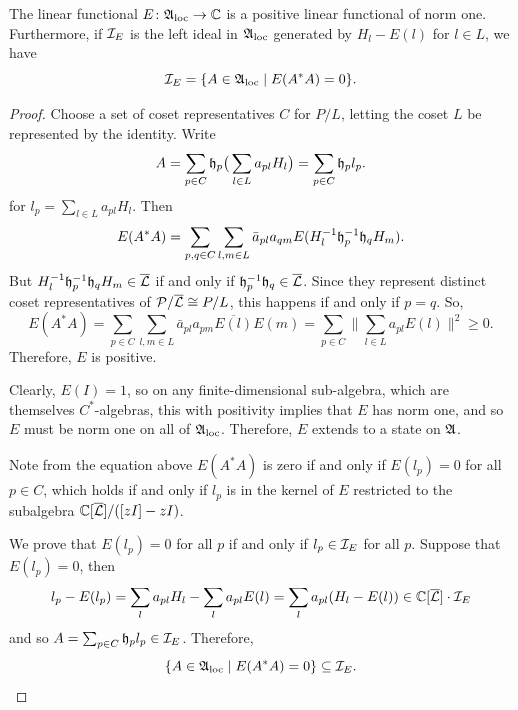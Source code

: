 \documentclass[11pt]{amsart}
\begin{document}
\begin{prop}
The linear functional $E \colon \mathfrak{A}_{\mathrm{loc}} \to \mathbb{C}$ is a positive linear functional of norm one.
Furthermore, if $\mathcal{I}_E$ is the left ideal in $\mathfrak{A}_{\mathrm{loc}}$ generated by $H_l-E(l)$ for $l\in L$, we have
\[\mathcal{I}_E = \{ A\in \mathfrak{A}_{\mathrm{loc}} \mid E(A^*A)=0\}.\]
\end{prop}
\begin{proof}
Choose a set of coset representatives $C$ for $P/L$, letting the coset $L$ be represented by the identity. Write
\[A = \sum_{p \in C}  \mathfrak{h}_p \big(\sum_{l \in L} a_{pl} H_l \big) = \sum_{p \in C}  \mathfrak{h}_p  l_p .\]
for $l_p = \sum_{l \in L} a_{pl}  H_l $. Then
\[E(A^*A) =  \sum_{p,q \in C} \sum_{l,m\in L} \bar{a}_{pl}a_{qm}E(H_l^{-1}\mathfrak{h}_p^{-1}\mathfrak{h}_qH_m).\]
But $H_l^{-1}\mathfrak{h}_p^{-1}\mathfrak{h}_q H_m \in \overline{\mathcal{L}}$ if and only if $\mathfrak{h}_p^{-1}\mathfrak{h}_q \in \overline{\mathcal{L}}$. Since they represent distinct coset representatives of $\mathcal{P}/\overline{\mathcal{L}} \cong P/L$, this happens if and only if $p=q$. So,
 \[E(A^*A) =  \sum_{p \in C} \sum_{l,m\in L} \bar{a}_{pl}a_{pm}\overline{E(l)}E(m) =  \sum_{p \in C}\big \| \sum_{l\in L} a_{pl}E(l) \big \|^2 \geq 0.\]
Therefore, $E$ is positive.

Clearly, $E(I)=1$, so on any finite-dimensional sub-algebra, which are themselves $C^*$-algebras, this with positivity implies that $E$ has norm one, and so $E$ must be norm one on all of $\mathfrak{A}_{\mathrm{loc}}$. Therefore, $E$ extends to a state on $\mathfrak{A}$.

Note from the equation above $E(A^*A) $ is zero if and only if
$ E(l_p)  =0$ for all $p\in C$, which holds if and only if $l_p$ is in the kernel of $E$ restricted to the subalgebra $\mathbb{C}[\overline{\mathcal{L}}]/([zI]-zI)$.

We prove that $ E(l_p)  =0$ for all $p$ if and only if $l_p \in \mathcal{I}_E$ for all $p$.
Suppose that $E(l_p)=0$, then
\[l_p-E(l_p) =   \sum_{l}  a_{pl} H_l-    \sum_{l}  a_{pl} E(l) =  \sum_{l}  a_{pl}  (H_l- E(l)) \in \mathbb{C}[\overline{\mathcal{L}}]\cdot \mathcal{I}_E \]
and so $A = \sum_{p \in C}  \mathfrak{h}_p  l_p \in \mathcal{I}_E$. Therefore,
\[\{ A \in \mathfrak{A}_{\mathrm{loc}} \mid E(A^*A) = 0 \} \subseteq \mathcal{I}_E.\]



\end{proof}
\end{document}
